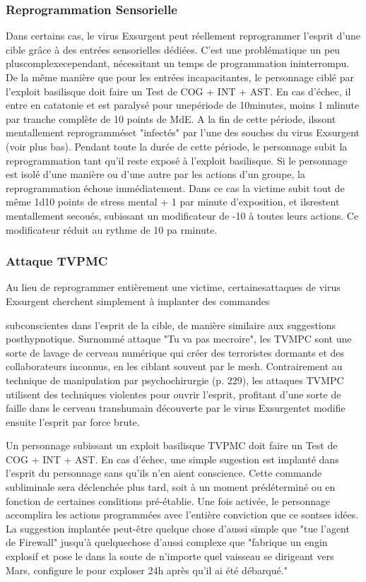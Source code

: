\subsubsection{Reprogrammation Sensorielle} 

Dans certains cas, le virus Exsurgent peut réellement reprogrammer l'esprit d'une cible grâce à des entrées sensorielles dédiées. C'est une problématique un peu pluscomplexecependant, nécessitant un temps de programmation ininterrompu. De la même manière que pour les entrées incapacitantes, le personnage ciblé par l'exploit basilisque doit faire un Test de COG + INT + AST. En cas d'échec, il entre en catatonie et est paralysé pour unepériode de 10minutes, moins 1 mlinute par tranche complète de 10 points de MdE. A la fin de cette période, ilssont mentallement reprogramméset "infectés" par l'une des souches du virus Exsurgent (voir plus bas). Pendant toute la durée de cette période, le personnage subit la reprogrammation tant qu'il reste exposé à l'exploit basilisque. Si le personnage est isolé d'une manière ou d'une autre par les actions d'un groupe, la reprogrammation échoue immédiatement. Dans ce cas la victime subit tout de même 1d10 points de stress mental + 1 par minute d'exposition, et ilsrestent mentallement secoués, subissant un modificateur de -10 à toutes leurs actions. Ce modificateur réduit au rythme de 10 pa rminute. 

\subsubsection{Attaque TVPMC} 

Au lieu de reprogrammer entièrement une victime, certainesattaques de virus Exsurgent cherchent simplement à implanter des commandes 

subconscientes dans l'esprit de la cible, de manière similaire aux suggestions posthypnotique. Surnommé attaque "Tu va pas mecroire", les TVMPC sont une sorte de lavage de cerveau numérique qui créer des terroristes dormants et des collaborateurs inconnus, en les ciblant souvent par le mesh. Contrairement au technique de manipulation par psychochirurgie (p. 229), les attaques TVMPC utilisent des techniques violentes pour ouvrir l'esprit, profitant d'une sorte de faille dans le cerveau transhumain découverte par le virus Exsurgentet modifie ensuite l'esprit par force brute. 

Un personnage subissant un exploit basilisque TVPMC doit faire un Test de COG + INT + AST. En cas d'échec, une simple sugestion est implanté dans l'esprit du personnage sans qu'ils n'en aient conscience. Cette commande subliminale sera déclenchée plus tard, soit à un moment prédéterminé ou en fonction de certaines conditions pré-établie. Une fois activée, le personnage accomplira les actions programmées avec l'entière conviction que ce sontses idées. La suggestion implantée peut-être quelque chose d'aussi simple que "tue l'agent de Firewall" jusqu'à quelquechose d'aussi complexe que "fabrique un engin explosif et pose le dans la soute de n'importe quel vaisseau se dirigeant vers Mars, configure le pour exploser 24h après qu'il ai été débarqué." 

